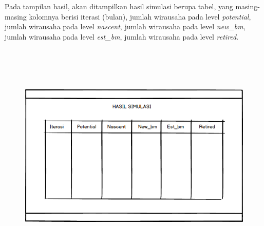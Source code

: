 Pada tampilan hasil, akan ditampilkan hasil simulasi berupa tabel, yang masing-masing kolomnya berisi iterasi (bulan), jumlah wirausaha pada level \textit{potential}, jumlah wirausaha pada level \textit{nascent}, jumlah wirausaha pada level \textit{new\_bm}, jumlah wirausaha pada level \textit{est\_bm}, jumlah wirausaha pada level \textit{retired}.
\begin{figure} [H]
	\centering  
	\includegraphics[width=13cm, height=11cm]{mockup6} 
	\label{fig:tampilanHasil} 
\end{figure}

